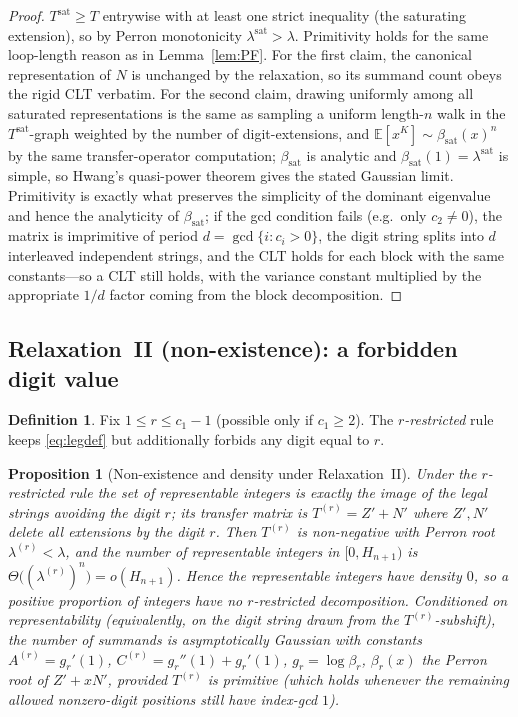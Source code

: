 \documentclass[12pt]{article}
\newtheorem{proposition}{Proposition}
\theoremstyle{definition}
\newtheorem{definition}{Definition}
\newcommand{\E}{\mathbb{E}}
\begin{document}
\begin{proof}
$T^{\mathrm{sat}}\ge T$ entrywise with at least one strict inequality (the
saturating extension), so by Perron monotonicity $\lambda^{\mathrm{sat}}>\lambda$.
Primitivity holds for the same loop-length reason as in Lemma~\ref{lem:PF}. For
the first claim, the canonical representation of $N$ is unchanged by the
relaxation, so its summand count obeys the rigid CLT verbatim. For the second
claim, drawing uniformly among all saturated representations is the same as
sampling a uniform length-$n$ walk in the $T^{\mathrm{sat}}$-graph weighted by
the number of digit-extensions, and $\E[x^{K}]\sim\beta_{\mathrm{sat}}(x)^n$ by
the same transfer-operator computation; $\beta_{\mathrm{sat}}$ is analytic and
$\beta_{\mathrm{sat}}(1)=\lambda^{\mathrm{sat}}$ is simple, so Hwang's
quasi-power theorem gives the stated Gaussian limit. Primitivity is exactly what
preserves the simplicity of the dominant eigenvalue and hence the analyticity of
$\beta_{\mathrm{sat}}$; if the gcd condition fails (e.g.\ only $c_2\ne0$), the
matrix is imprimitive of period $d=\gcd\{i:c_i>0\}$, the digit string splits into
$d$ interleaved independent strings, and the CLT holds for each block with the
same constants---so a CLT still holds, with the variance constant multiplied by
the appropriate $1/d$ factor coming from the block decomposition.
\end{proof}

\subsection{Relaxation~II (non-existence): a forbidden digit value}
\begin{definition}\label{def:forb}
Fix $1\le r\le c_1-1$ (possible only if $c_1\ge2$). The \emph{$r$-restricted}
rule keeps \eqref{eq:legdef} but additionally forbids any digit equal to $r$.
\end{definition}

\begin{proposition}[Non-existence and density under Relaxation~II]
\label{prop:noexist}
Under the $r$-restricted rule the set of representable integers is exactly the
image of the legal strings avoiding the digit $r$; its transfer matrix is
$T^{(r)}=Z'+N'$ where $Z',N'$ delete all extensions by the digit $r$. Then
$T^{(r)}$ is non-negative with Perron root $\lambda^{(r)}<\lambda$, and the number
of representable integers in $[0,H_{n+1})$ is
$\Theta\big((\lambda^{(r)})^{n}\big)=o(H_{n+1})$. Hence the representable
integers have density $0$, so a positive proportion of integers have no
$r$-restricted decomposition. Conditioned on representability (equivalently, on
the digit string drawn from the $T^{(r)}$-subshift), the number of summands is
asymptotically Gaussian with constants $A^{(r)}=g_r'(1)$,
$C^{(r)}=g_r''(1)+g_r'(1)$, $g_r=\log\beta_r$, $\beta_r(x)$ the Perron root of
$Z'+xN'$, provided $T^{(r)}$ is primitive (which holds whenever the remaining
allowed nonzero-digit positions still have index-gcd $1$).
\end{proposition}
\end{document}
